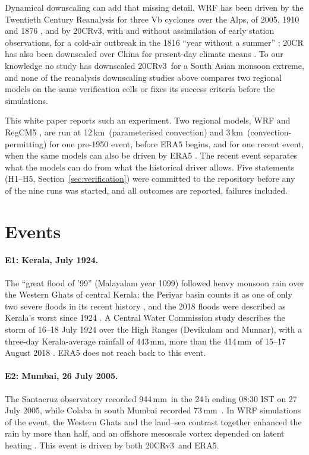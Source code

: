 \documentclass[11pt,a4paper]{article}
\newcommand{\twcr}{20CRv3}
\newcommand{\km}{\,km}
\newcommand{\mm}{\,mm}
\begin{document}
Dynamical downscaling can add that missing detail. WRF has been driven by the Twentieth
Century Reanalysis for three Vb cyclones over the Alps, of 2005, 1910 and 1876
\citep{stucki2020}, and by \twcr, with and without assimilation of early station
observations, for a cold-air outbreak in the 1816 ``year without a summer''
\citep{stucki2024}; 20CR has also been downscaled over China for present-day climate means
\citep{kong2015}. To our knowledge no study has downscaled \twcr\ for a South Asian monsoon
extreme, and none of the reanalysis downscaling studies above compares two regional models
on the same verification cells or fixes its success criteria before the simulations.

This white paper reports such an experiment. Two regional models, WRF \citep{skamarock2019}
and RegCM5 \citep{giorgi2023}, are run at 12\km\ (parameterised convection) and 3\km\
(convection-permitting) for one pre-1950 event, before ERA5 begins, and for one recent
event, when the same models can also be driven by ERA5
\citep{hersbach2020}. The recent event separates what the models can do from what the
historical driver allows. Five statements (H1--H5, Section~\ref{sec:verification}) were
committed to the repository before any of the nine runs was started, and all outcomes are
reported, failures included.

\section{Events}

\paragraph{E1: Kerala, July 1924.} The ``great flood of '99'' (Malayalam year 1099) followed
heavy monsoon rain over the Western Ghats of central Kerala; the Periyar basin counts it as
one of only two severe floods in its recent history \citep{sudheer2019}, and the 2018
floods were described as Kerala's worst since 1924 \citep{hunt2020}. A Central Water
Commission study describes the storm of 16--18 July 1924 over the High Ranges (Devikulam and
Munnar), with a three-day Kerala-average rainfall of 443\mm, more than the 414\mm\ of
15--17 August 2018 \citep{cwc2018}. ERA5 does not reach back to this event.

\paragraph{E2: Mumbai, 26 July 2005.} The Santacruz observatory recorded 944\mm\ in the
24\,h ending 08:30 IST on 27 July 2005, while Colaba in south Mumbai recorded 73\mm\
\citep{kumar2008}. In WRF simulations of the event, the Western Ghats and the land--sea
contrast together enhanced the rain by more than half, and an offshore mesoscale vortex
depended on latent heating \citep{kumar2008}. This event is driven by both \twcr\ and ERA5.
\end{document}
